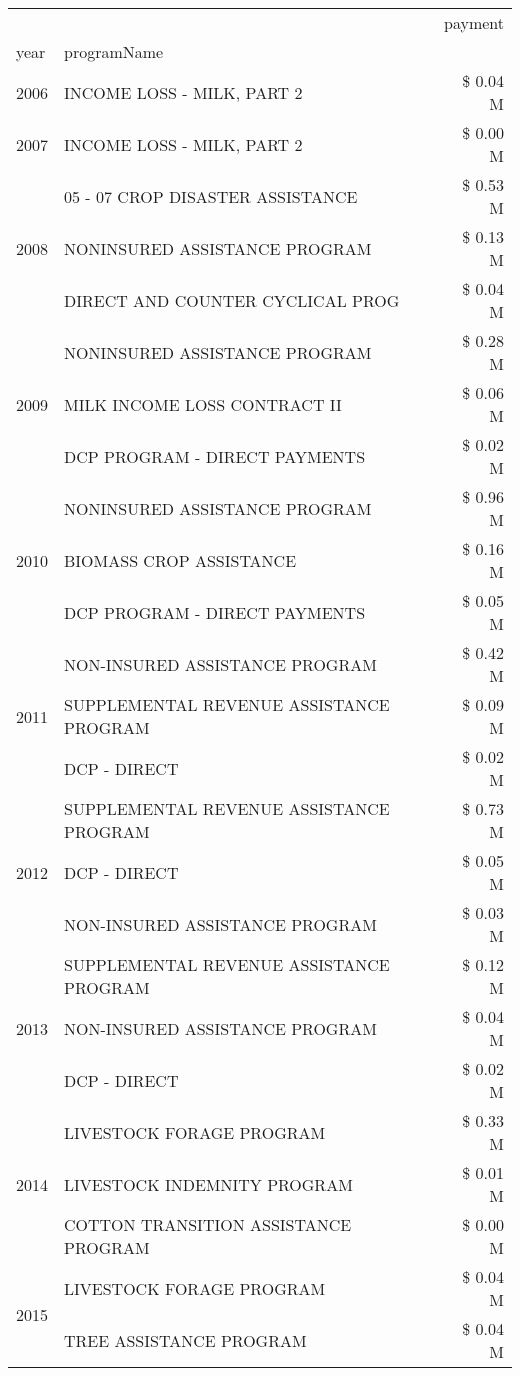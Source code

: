\begin{tabular}{llr}
\toprule
 &  & payment \\
year & programName &  \\
\midrule
2006 & INCOME LOSS - MILK, PART 2 & \$ 0.04 M \\
\cline{1-3}
2007 & INCOME LOSS - MILK, PART 2 & \$ 0.00 M \\
\cline{1-3}
\multirow[t]{3}{*}{2008} & 05 - 07 CROP DISASTER ASSISTANCE & \$ 0.53 M \\
 & NONINSURED ASSISTANCE PROGRAM & \$ 0.13 M \\
 & DIRECT AND COUNTER CYCLICAL PROG & \$ 0.04 M \\
\cline{1-3}
\multirow[t]{3}{*}{2009} & NONINSURED ASSISTANCE PROGRAM & \$ 0.28 M \\
 & MILK INCOME LOSS CONTRACT II & \$ 0.06 M \\
 & DCP PROGRAM - DIRECT PAYMENTS & \$ 0.02 M \\
\cline{1-3}
\multirow[t]{3}{*}{2010} & NONINSURED ASSISTANCE PROGRAM & \$ 0.96 M \\
 & BIOMASS CROP ASSISTANCE & \$ 0.16 M \\
 & DCP PROGRAM - DIRECT PAYMENTS & \$ 0.05 M \\
\cline{1-3}
\multirow[t]{3}{*}{2011} & NON-INSURED ASSISTANCE PROGRAM & \$ 0.42 M \\
 & SUPPLEMENTAL REVENUE ASSISTANCE PROGRAM & \$ 0.09 M \\
 & DCP - DIRECT & \$ 0.02 M \\
\cline{1-3}
\multirow[t]{3}{*}{2012} & SUPPLEMENTAL REVENUE ASSISTANCE PROGRAM & \$ 0.73 M \\
 & DCP - DIRECT & \$ 0.05 M \\
 & NON-INSURED ASSISTANCE PROGRAM & \$ 0.03 M \\
\cline{1-3}
\multirow[t]{3}{*}{2013} & SUPPLEMENTAL REVENUE ASSISTANCE PROGRAM & \$ 0.12 M \\
 & NON-INSURED ASSISTANCE PROGRAM & \$ 0.04 M \\
 & DCP - DIRECT & \$ 0.02 M \\
\cline{1-3}
\multirow[t]{3}{*}{2014} & LIVESTOCK FORAGE PROGRAM & \$ 0.33 M \\
 & LIVESTOCK INDEMNITY PROGRAM & \$ 0.01 M \\
 & COTTON TRANSITION ASSISTANCE PROGRAM & \$ 0.00 M \\
\cline{1-3}
\multirow[t]{3}{*}{2015} & LIVESTOCK FORAGE PROGRAM & \$ 0.04 M \\
 & TREE ASSISTANCE PROGRAM & \$ 0.04 M \\

\end{tabular}
